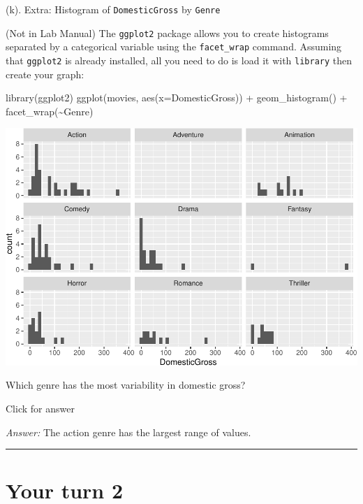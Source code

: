 \documentclass[
]{book}
\newenvironment{Shaded}{\begin{snugshade}}{\end{snugshade}}
\newcommand{\AttributeTok}[1]{\textcolor[rgb]{0.77,0.63,0.00}{#1}}
\newcommand{\FunctionTok}[1]{\textcolor[rgb]{0.00,0.00,0.00}{#1}}
\newcommand{\NormalTok}[1]{#1}
\newcommand{\SpecialCharTok}[1]{\textcolor[rgb]{0.00,0.00,0.00}{#1}}
\begin{document}
(k). Extra: Histogram of \texttt{DomesticGross} by \texttt{Genre}

(Not in Lab Manual) The \texttt{ggplot2} package allows you to create histograms separated by a categorical variable using the \texttt{facet\_wrap} command. Assuming that \texttt{ggplot2} is already installed, all you need to do is load it with \texttt{library} then create your graph:

\begin{Shaded}
\begin{Highlighting}[]
\FunctionTok{library}\NormalTok{(ggplot2)}
\FunctionTok{ggplot}\NormalTok{(movies, }\FunctionTok{aes}\NormalTok{(}\AttributeTok{x=}\NormalTok{DomesticGross)) }\SpecialCharTok{+} 
  \FunctionTok{geom\_histogram}\NormalTok{() }\SpecialCharTok{+} 
  \FunctionTok{facet\_wrap}\NormalTok{(}\SpecialCharTok{\textasciitilde{}}\NormalTok{Genre)}
\end{Highlighting}
\end{Shaded}

\includegraphics[width=1\linewidth]{Class_Activity_5_files/figure-latex/unnamed-chunk-15-1}

Which genre has the most variability in domestic gross?

Click for answer

\emph{Answer:} The action genre has the largest range of values.

\begin{center}\rule{0.5\linewidth}{0.5pt}\end{center}

\hypertarget{your-turn-2-3}{%
\section{Your turn 2}\label{your-turn-2-3}}
\end{document}
